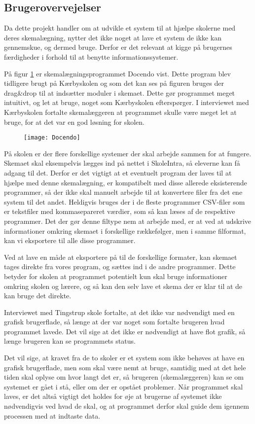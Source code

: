 \subsection{Brugerovervejelser}
Da dette projekt handler om at udvikle et system til at hjælpe skolerne med deres skemalægning, nytter det ikke noget at lave et system de ikke kan gennemskue, og dermed bruge. Derfor er det relevant at kigge på brugernes færdigheder i forhold til at benytte informationssystemer.

På figur \ref{fig:docendo_skema} er skemalægningsprogrammet Docendo vist. Dette program blev tidligere brugt på Kærbyskolen og som det kan ses på figuren bruges der drag\&drop til at indsætter moduler i skemaet. Dette gør programmet meget intuitivt, og let at bruge, noget som Kærbyskolen efterspørger. I interviewet med Kærbyskolen fortalte skemalæggeren at programmet skulle være meget let at bruge, for at det var en god løsning for skolen.

\begin{figure}[h!]
	\centering
	\texttt{[image: Docendo]}
	\label{fig:docendo_skema}
\end{figure}

På skolen er der flere forskellige systemer der skal arbejde sammen for at fungere. Skemaet skal eksempelvis lægges ind på nettet i SkoleIntra, så eleverne kan få adgang til det. Derfor er det vigtigt at et eventuelt program der laves til at hjælpe med denne skemalægning, er kompatibelt med disse allerede eksisterende programmer, så der ikke skal manuelt arbejde til at konvertere filer fra det ene system til det andet. Heldigvis bruges der i de fleste programmer CSV-filer som er tekstfiler med kommasepareret værdier, som så kan læses af de respektive programmer. Det der gør denne filtype nem at arbejde med, er at ved at udskrive informationer omkring skemaet i forskellige rækkefølger, men i samme filformat, kan vi eksportere til alle disse programmer.

Ved at lave en måde at eksportere på til de forskellige formater, kan skemaet tages direkte fra vores program, og sættes ind i de andre programmer. Dette betyder for skolen at programmet potentielt kun skal bruge informationer omkring skolen og lærere, og så kan den selv lave et skema der er klar til at de kan bruge det direkte.

Interviewet med Tingstrup skole fortalte, at det ikke var nødvendigt med en grafisk brugerflade, så længe at der var noget som fortalte brugeren hvad programmet lavede. Det vil sige at det ikke er nødvendigt at have flot grafik, så længe brugeren kan se programmets status. 

Det vil sige, at kravet fra de to skoler er et system som ikke behøves at have en grafisk brugerflade, men som skal være nemt at bruge, samtidig med at det hele tiden skal oplyse om hvor langt det er, så brugeren (skemalæggeren) kan se om systemet er gået i stå, eller om der er opstået problemer. Når programmet skal laves, er det altså vigtigt det holdes for øje at brugerne af systemet ikke nødvendigvis ved hvad de skal, og at programmet derfor skal guide dem igennem processen med at indtaste data.